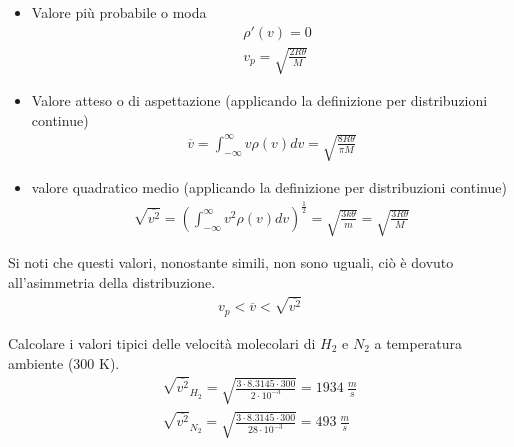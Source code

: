 \documentclass[
10pt, %
a4paper, %
oneside, %
headinclude,footinclude, %
BCOR5mm, %
]{scrartcl}
\begin{document}
\begin{itemize}
	\item Valore più probabile o moda
	\begin{align*} 
		&\rho'(v)  =  0\\
		&v_p = \sqrt{\frac{2R\theta}{M}}
	\end{align*} 
	\item Valore atteso o di aspettazione (applicando la definizione per distribuzioni continue)
	\begin{align*} 
		\overline{v} = \int_{-\infty}^{\infty}v \rho(v)dv = \sqrt{\frac{8R\theta}{\pi M}}
	\end{align*} 
	\item valore quadratico medio (applicando la definizione per distribuzioni continue)
	\begin{align*} 
		\sqrt{\overline{v^2}} = \left(\int_{-\infty}^{\infty}v^2 \rho(v)dv\right)^{\frac{1}{2}} = \sqrt{\frac{3k\theta}{m}}= \sqrt{\frac{3R\theta}{M}}
	\end{align*} 
\end{itemize}
Si noti che questi valori, nonostante simili, non sono uguali, ciò è dovuto all'asimmetria della distribuzione. 
\begin{align*} 
	v_p<\overline{v}<\sqrt{\overline{v^2}}
\end{align*} 
\begin{exercise}
	Calcolare i valori tipici delle velocità molecolari di $H_2$ e $N_2$ a temperatura ambiente (300 K).
	\begin{align*} 
		\sqrt{\overline{v^2}}_{H_2}=\sqrt{\frac{3\cdot 8.3145\cdot 300}{2\cdot 10^{-3}}}=1934\ \frac{m}{s}\\
		\sqrt{\overline{v^2}}_{N_2}=\sqrt{\frac{3\cdot 8.3145\cdot 300}{28\cdot 10^{-3}}}=493\ \frac{m}{s}\\
	\end{align*} 
\end{exercise}
\end{document}
